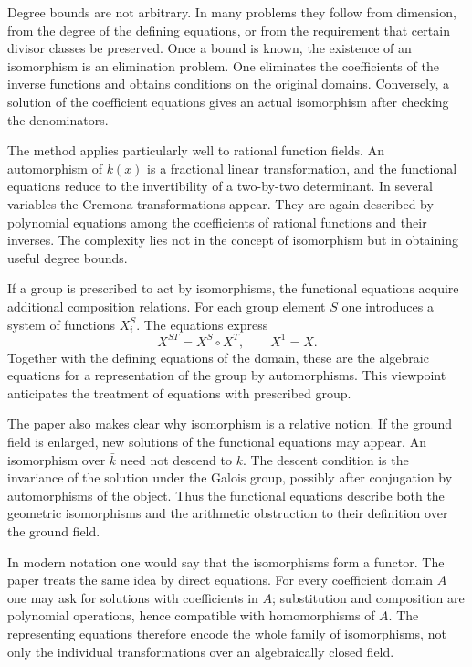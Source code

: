\documentclass[11pt]{article}
\begin{document}
Degree bounds are not arbitrary. In many problems they follow from dimension, from the degree of the
defining equations, or from the requirement that certain divisor classes be preserved. Once a bound
is known, the existence of an isomorphism is an elimination problem. One eliminates the coefficients
of the inverse functions and obtains conditions on the original domains. Conversely, a solution of
the coefficient equations gives an actual isomorphism after checking the denominators.


The method applies particularly well to rational function fields. An automorphism of \(k(x)\) is a
fractional linear transformation, and the functional equations reduce to the invertibility of a
two-by-two determinant. In several variables the Cremona transformations appear. They are again
described by polynomial equations among the coefficients of rational functions and their inverses.
The complexity lies not in the concept of isomorphism but in obtaining useful degree bounds.


If a group is prescribed to act by isomorphisms, the functional equations acquire additional
composition relations. For each group element \(S\) one introduces a system of functions \(X_i^S\).
The equations express \[   X^{ST}=X^S\circ X^T,   \qquad X^1=X. \] Together with the defining
equations of the domain, these are the algebraic equations for a representation of the group by
automorphisms. This viewpoint anticipates the treatment of equations with prescribed group.


The paper also makes clear why isomorphism is a relative notion. If the ground field is enlarged,
new solutions of the functional equations may appear. An isomorphism over \(\bar k\) need not
descend to \(k\). The descent condition is the invariance of the solution under the Galois group,
possibly after conjugation by automorphisms of the object. Thus the functional equations describe
both the geometric isomorphisms and the arithmetic obstruction to their definition over the ground
field.


In modern notation one would say that the isomorphisms form a functor. The paper treats the same
idea by direct equations. For every coefficient domain \(A\) one may ask for solutions with
coefficients in \(A\); substitution and composition are polynomial operations, hence compatible with
homomorphisms of \(A\). The representing equations therefore encode the whole family of
isomorphisms, not only the individual transformations over an algebraically closed field.
\end{document}

